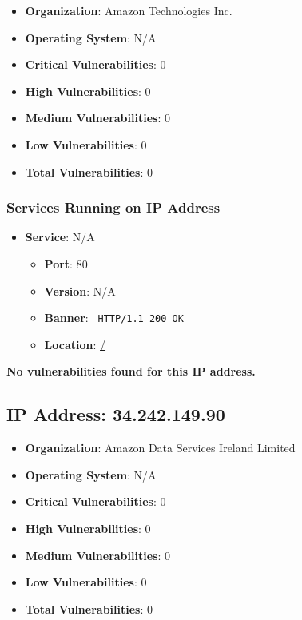 \documentclass{article}
\begin{document}
\begin{itemize}
    \item \textbf{Organization}: Amazon Technologies Inc.
    \item \textbf{Operating System}:  N/A 
    \item \textbf{Critical Vulnerabilities}: 0
    \item \textbf{High Vulnerabilities}: 0
    \item \textbf{Medium Vulnerabilities}: 0
    \item \textbf{Low Vulnerabilities}: 0
    \item \textbf{Total Vulnerabilities}: 0
\end{itemize}

\subsubsection*{Services Running on IP Address}

\begin{itemize}
    
        \item \textbf{Service}: N/A
        \begin{itemize}
            \item \textbf{Port}: 80
            \item \textbf{Version}:  N/A 
            \item \textbf{Banner}: \texttt{ HTTP/1.1 200 OK
 }
            \item \textbf{Location}: \href{ / }{ / }
        \end{itemize}
    
\end{itemize}


\textbf{No vulnerabilities found for this IP address.}


\clearpage



\subsection*{IP Address: 34.242.149.90}

\begin{itemize}
    \item \textbf{Organization}: Amazon Data Services Ireland Limited
    \item \textbf{Operating System}:  N/A 
    \item \textbf{Critical Vulnerabilities}: 0
    \item \textbf{High Vulnerabilities}: 0
    \item \textbf{Medium Vulnerabilities}: 0
    \item \textbf{Low Vulnerabilities}: 0
    \item \textbf{Total Vulnerabilities}: 0
\end{itemize}
\end{document}
